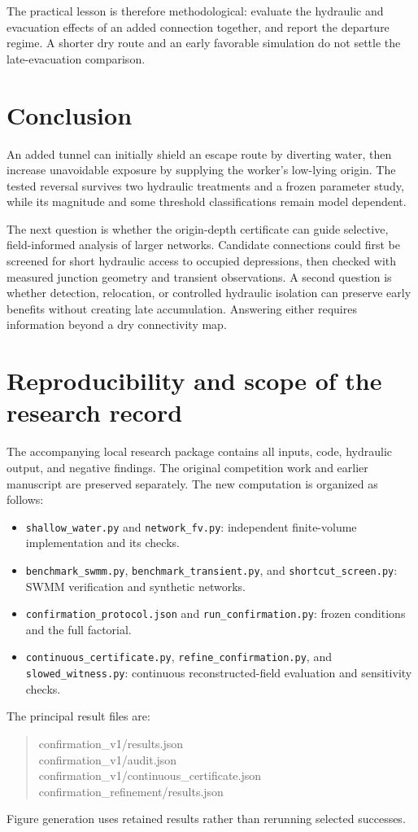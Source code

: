 \documentclass[11pt]{article}
\begin{document}
The practical lesson is therefore methodological: evaluate the hydraulic and evacuation effects of an added connection together, and report the departure regime. A shorter dry route and an early favorable simulation do not settle the late-evacuation comparison.

\section{Conclusion}
An added tunnel can initially shield an escape route by diverting water, then increase unavoidable exposure by supplying the worker's low-lying origin. The tested reversal survives two hydraulic treatments and a frozen parameter study, while its magnitude and some threshold classifications remain model dependent.

The next question is whether the origin-depth certificate can guide selective, field-informed analysis of larger networks. Candidate connections could first be screened for short hydraulic access to occupied depressions, then checked with measured junction geometry and transient observations. A second question is whether detection, relocation, or controlled hydraulic isolation can preserve early benefits without creating late accumulation. Answering either requires information beyond a dry connectivity map.

\appendix
\section{Reproducibility and scope of the research record}
The accompanying local research package contains all inputs, code, hydraulic output, and negative findings. The original competition work and earlier manuscript are preserved separately. The new computation is organized as follows:
\begin{itemize}
\item \texttt{shallow\_water.py} and \texttt{network\_fv.py}: independent finite-volume implementation and its checks.
\item \texttt{benchmark\_swmm.py}, \texttt{benchmark\_transient.py}, and \texttt{shortcut\_screen.py}: SWMM verification and synthetic networks.
\item \texttt{confirmation\_protocol.json} and \texttt{run\_confirmation.py}: frozen conditions and the full factorial.
\item \texttt{continuous\_certificate.py}, \texttt{refine\_confirmation.py}, and \texttt{slowed\_witness.py}: continuous reconstructed-field evaluation and sensitivity checks.
\end{itemize}
The principal result files are:
\begin{quote}\small\ttfamily
confirmation\_v1/results.json\\
confirmation\_v1/audit.json\\
confirmation\_v1/continuous\_certificate.json\\
confirmation\_refinement/results.json
\end{quote}
Figure generation uses retained results rather than rerunning selected successes.
\end{document}
